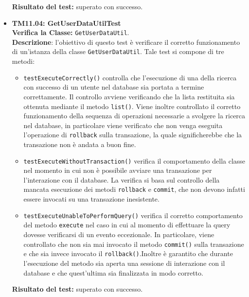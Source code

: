 \begin{itemize}
\begin{itemize}
\end{itemize}
\textbf{Risultato del test:} superato con successo.


\item \textbf{TM11.04: GetUserDataUtilTest}\\
\textbf{Verifica la Classe:} \texttt{GetUserDataUtil}.\\
\textbf{Descrizione}: l'obiettivo di questo test è verificare il corretto funzionamento di un'istanza della classe \texttt{GetUserDataUtil}.
Tale test si compone di tre metodi:
\begin{itemize}
\item \texttt{testExecuteCorrectly()} controlla che l'esecuzione di una della ricerca con successo di un utente nel database sia portata a termine correttamente. 
Il controllo avviene verificando che la lista restituita sia ottenuta mediante il metodo \texttt{list()}. 
Viene inoltre controllato il corretto funzionamento della sequenza di operazioni necessarie a svolgere la ricerca nel database, in particolare viene verificato che non venga eseguita l'operazione di \texttt{rollback} sulla transazione, la quale significherebbe che la transazione non è andata a buon fine.
 
\item \texttt{testExecuteWithoutTransaction()}
verifica il comportamento della classe nel momento in cui non è possibile avviare una transazione per l'interazione con il database.
La verifica si basa sul controllo della mancata esecuzione dei metodi \texttt{rollback} e \texttt{commit}, che non devono infatti essere invocati su una transazione inesistente.

\item \texttt{testExecuteUnableToPerformQuery()} verifica il corretto comportamento del metodo \texttt{execute} nel caso in cui al momento di effettuare la query dovesse verificarsi di un evento eccezionale. In particolare, viene controllato che non sia mai invocato il metodo \texttt{commit()} sulla transazione e che sia invece invocato il \texttt{rollback()}.Inoltre è garantito che durante l'esecuzione del metodo sia aperta una sessione di interazione con il database e che quest'ultima sia finalizzata in modo corretto. 
\end{itemize}
\textbf{Risultato del test:} superato con successo.



\end{itemize}
